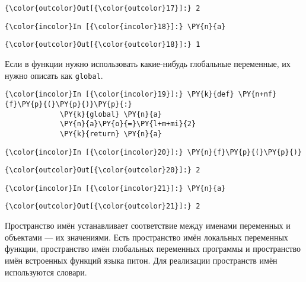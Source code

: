             \begin{Verbatim}[commandchars=\\\{\}]
{\color{outcolor}Out[{\color{outcolor}17}]:} 2
\end{Verbatim}
        
    \begin{Verbatim}[commandchars=\\\{\}]
{\color{incolor}In [{\color{incolor}18}]:} \PY{n}{a}
\end{Verbatim}

            \begin{Verbatim}[commandchars=\\\{\}]
{\color{outcolor}Out[{\color{outcolor}18}]:} 1
\end{Verbatim}
        
    Если в функции нужно использовать какие-нибудь глобальные переменные, их
нужно описать как \texttt{global}.

    \begin{Verbatim}[commandchars=\\\{\}]
{\color{incolor}In [{\color{incolor}19}]:} \PY{k}{def} \PY{n+nf}{f}\PY{p}{(}\PY{p}{)}\PY{p}{:}
             \PY{k}{global} \PY{n}{a}
             \PY{n}{a}\PY{o}{=}\PY{l+m+mi}{2}
             \PY{k}{return} \PY{n}{a}
\end{Verbatim}

    \begin{Verbatim}[commandchars=\\\{\}]
{\color{incolor}In [{\color{incolor}20}]:} \PY{n}{f}\PY{p}{(}\PY{p}{)}
\end{Verbatim}

            \begin{Verbatim}[commandchars=\\\{\}]
{\color{outcolor}Out[{\color{outcolor}20}]:} 2
\end{Verbatim}
        
    \begin{Verbatim}[commandchars=\\\{\}]
{\color{incolor}In [{\color{incolor}21}]:} \PY{n}{a}
\end{Verbatim}

            \begin{Verbatim}[commandchars=\\\{\}]
{\color{outcolor}Out[{\color{outcolor}21}]:} 2
\end{Verbatim}
        
    Пространство имён устанавливает соответствие между именами переменных и
объектами --- их значениями. Есть пространство имён локальных переменных
функции, пространство имён глобальных переменных программы и
пространство имён встроенных функций языка питон. Для реализации
пространств имён используются словари.

